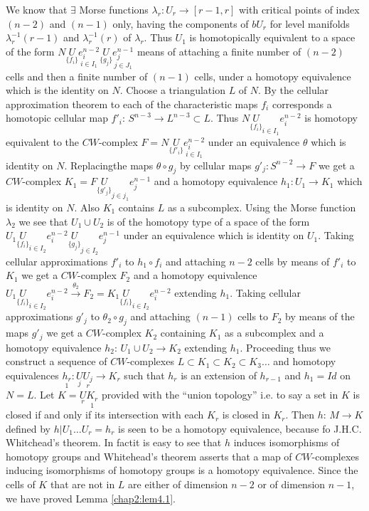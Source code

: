 We know that $\exists$ Morse functions $\lambda_r: U_r \to [r-1, r]$
with critical points of index $(n-2)$ and $(n-1)$ only, having the
components of $bU_r$ for level manifolds $\lambda^{-1}_{r}(r-1)$ and
$\lambda^{-1}_{r}(r)$ of $\lambda_r$. Thus $U_1$ is homotopically
equivalent to a space of the form $N \underset{\{f_i\}}{U} \underset{i \in
    I_1}{e_i^{n-2}} \underset{\{g_j\}}{U} \underset{j \in J_1}{e^{n-1}_j}
$ means of attaching a finite number of $(n-2)$ cells and
then a finite number of $(n-1)$ cells, under a homotopy equivalence
which is the identity on $N$. Choose a triangulation $L$ of $N$. By
the cellular approximation theorem to each of the characteristic maps
$f_i$ corresponds a homotopic cellular map $f'_i$: $S^{n-3} \to
L^{n-3} \subset L$. Thus $N \underset{\{f_i\}}{U}_{i \in I_1} e_i
^{n-2}$ is homotopy equivalent to the $CW$-complex $F= N
\underset{\{f'_i\}}{U} \underset{i \in I_1}{e_i ^{n-2}}$ under an
equivalence $\theta$ which is identity on $N$. 
Replacing\pageoriginale the maps $\theta \circ g_j$ by cellular maps
$g'_j: S^{n-2}\to F$ we get a $CW$-complex $K_1 = F
\underset{\{g'_j\}}{U}_{j \in j_1} e_j^{n-1}$ and a homotopy
equivalence $h_1:U_1 \to K_1$ which is identity on $N$. Also $K_1$
contains $L$ as a subcomplex. Using the Morse function $\lambda_2$ we
see that $U_1 \cup U_2$ is of the homotopy type of a space of the form
$U_1 \underset{\{f_i\}}{U}_{i \in I_2} e_i^{n-2} 
\underset{\{g_j\}}{U}_{j \in I_2} e_j^{n-1}$ under an
equivalence which is identity on $U_1$. Taking cellular approximations
$f'_i$ to $h_1 \circ f_i$ and attaching $n-2$ cells by means of $f'_i$ to
$K_1$ we get a $CW$-complex $F_2$ and a homotopy equivalence $U_1
\underset{\{f_i\}}{U}_{i \in I_2} e_i ^{n-2} \xrightarrow{\theta_2}
 F_2= K_1 \underset{\{f_i\}}{U}_{i
  \in I_2} e_i ^{n-2}$ extending $h_1$. Taking cellular
approximations $g'_j$ to $\theta_2 \circ g_j$ and attaching $(n-1)$ cells
to $F_2$ by means of the maps $g'_j$ we get a $CW$-complex $K_2$
containing $K_1$ as a subcomplex and a homotopy equivalence $h_2$:
$U_1 \cup U_2 \to K_2$ extending $h_1$. Proceeding thus we construct a
sequence of $CW$-complexes $L \subset K_1 \subset K_2 \subset K_3
\ldots$ and homotopy equivalences $\underset{1}{h_r} : \underset{j}{U}
      \underset{r}{U_j} \to K_r$ such that $h_r$ is an extension of
      $h_{r-1}$ and $h_1 = Id$ 
on $N = L$. Let $K = \underset{r}{U}\underset{1}{K_r}$ provided with the ``union
topology'' i.e. to say a set in $K$ is closed if and only if its
intersection with each $K_r$ is closed in $K_r$. Then $h$: $M \to K$
defined by $h | U_1 \ldots U_r=h_r$ is seen to be a homotopy
equivalence, because fo J.H.C. Whitchead's theorem. In
fact\pageoriginale it is easy 
to see that $h$ induces isomorphisms of homotopy groups and
Whitehead's theorem asserts that a map of $CW$-complexes inducing
isomorphisms of homotopy groups is a homotopy equivalence. Since the
cells of $K$ that are not in $L$ are either of dimension $n-2$ or of
dimension $n-1$, we have proved Lemma \ref{chap2:lem4.1}.  

